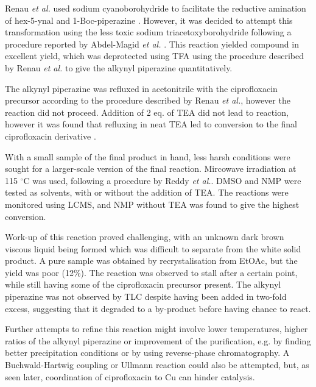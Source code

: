 Renau \textit{et al.}\cite{Renau1996} used sodium cyanoborohydride to facilitate the reductive amination of hex-5-ynal  and 1-Boc-piperazine . However, it was decided to attempt this transformation using the less toxic sodium triacetoxyborohydride following a procedure reported by Abdel-Magid \textit{et al.} \cite{Abdel-Magid1996}. This reaction yielded compound  in excellent yield, which was deprotected using TFA using the procedure described by Renau \textit{et al.}\cite{Renau1996} to give the alkynyl piperazine  quantitatively. 

The alkynyl piperazine  was refluxed in acetonitrile with the ciprofloxacin precursor  according to the procedure described by Renau \textit{et al.}\cite{Renau1996}, however the reaction did not proceed. Addition of 2 eq. of TEA did not lead to reaction, however it was found that refluxing in neat TEA led to conversion to the final ciprofloxacin derivative .

With a small sample of the final product in hand, less harsh conditions were sought for a larger-scale version of the final reaction. Mircowave irradiation at 115 $^{\circ}$C was used, following a procedure by Reddy \textit{et al.}\cite{Reddy2001}. DMSO and NMP were tested as solvents, with or without the addition of TEA. The reactions were monitored using LCMS, and NMP without TEA was found to give the highest conversion. 

Work-up of this reaction proved challenging, with an unknown dark brown viscous liquid being formed which was difficult to separate from the white solid product. A pure sample was obtained by recrystalisation from EtOAc, but the yield was poor (12\%). The reaction was observed to stall after a certain point, while still having some of the ciprofloxacin precursor  present. The alkynyl piperazine  was not observed by TLC despite having been added in two-fold excess, suggesting that it degraded to a by-product before having chance to react. 

Further attempts to refine this reaction might involve lower temperatures, higher ratios of the alkynyl piperazine  or improvement of the purification, e.g. by finding better precipitation conditions or by using reverse-phase chromatography. A Buchwald-Hartwig coupling or Ullmann reaction could also be attempted, but, as seen later, coordination of ciprofloxacin  to Cu can hinder catalysis.

